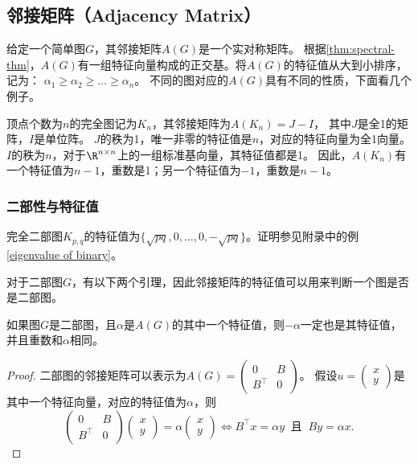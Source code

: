 \documentclass[lang=cn,newtx,10pt,scheme=chinese,chinesefont=nofont,citestyle=gb7714-2015, bibstyle=gb7714-2015]{elegantbook}
\begin{document}
\begin{refsection}
\subsection{邻接矩阵（Adjacency Matrix）}
给定一个简单图$G$，其邻接矩阵$A(G)$是一个实对称矩阵。
根据\cref{thm:spectral-thm}，$A(G)$有一组特征向量构成的正交基。将$A(G)$的特征值从大到小排序，记为：
$\alpha_1\ge\alpha_2\ge\dots\ge\alpha_n$。
不同的图对应的$A(G)$具有不同的性质，下面看几个例子。

\example 顶点个数为$n$的完全图记为$K_n$，其邻接矩阵为$A(K_n)=J-I$，
其中$J$是全1的矩阵，$I$是单位阵。
$J$的秩为1，唯一非零的特征值是$n$，对应的特征向量为全1向量。
$I$的秩为$n$，对于$\R^{n\times n}$上的一组标准基向量，其特征值都是1。
因此，$A(K_n)$有一个特征值为$n-1$，重数是1；另一个特征值为$-1$，重数是$n-1$。
\subsubsection{二部性与特征值}

\example 完全二部图$K_{p,q}$的特征值为$\{\sqrt{pq},0,\ldots,0,-\sqrt{pq}\}$。证明参见附录中的例\ref{eigenvalue of binary}。


\example 对于二部图$G$，有以下两个引理，因此邻接矩阵的特征值可以用来判断一个图是否是二部图。

\begin{lemma}\label{lem:bipartite-1}
    如果图$G$是二部图，且$\alpha$是$A(G)$的其中一个特征值，则$-\alpha$一定也是其特征值，并且重数和$\alpha$相同。
\end{lemma}

\begin{proof}
    二部图的邻接矩阵可以表示为$A(G)=\left(\begin{array}{cc}
    0 & B \\
    B^\top & 0
    \end{array}\right)$。
    假设$u=\left(\begin{array}{cc}
    x \\
    y
    \end{array}\right)$是其中一个特征向量，对应的特征值为$\alpha$，则
    \[
    \left(\begin{array}{cc}
    0 & B \\
    B^\top & 0
    \end{array}\right)
    \left(\begin{array}{cc}
    x \\
    y
    \end{array}\right)
    =\alpha\left(\begin{array}{cc}
    x \\
    y
    \end{array}\right)
    \Longleftrightarrow
    B^\top x=\alpha y\ \text{ 且 }\ By=\alpha x.
    \]


\end{proof}
\end{refsection}
\end{document}

